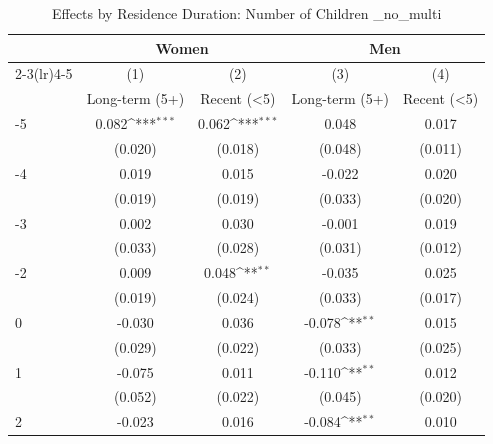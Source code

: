 \begin{table}[htbp]\centering
\def\sym#1{\ifmmode^{#1}\else\(^{#1}\)\fi}
\caption{Effects by Residence Duration: Number of Children \_no\_multi}
\begin{tabular}{l*{4}{c}}
\hline\hline
            &\multicolumn{2}{c}{Women}                  &\multicolumn{2}{c}{Men}                    \\\cmidrule(lr){2-3}\cmidrule(lr){4-5}
            &\multicolumn{1}{c}{(1)}&\multicolumn{1}{c}{(2)}&\multicolumn{1}{c}{(3)}&\multicolumn{1}{c}{(4)}\\
            &\multicolumn{1}{c}{Long-term (5+)}&\multicolumn{1}{c}{Recent (<5)}&\multicolumn{1}{c}{Long-term (5+)}&\multicolumn{1}{c}{Recent (<5)}\\
\hline
-5          &       0.082\sym{***}&       0.062\sym{***}&       0.048         &       0.017         \\
            &     (0.020)         &     (0.018)         &     (0.048)         &     (0.011)         \\
[1em]
-4          &       0.019         &       0.015         &      -0.022         &       0.020         \\
            &     (0.019)         &     (0.019)         &     (0.033)         &     (0.020)         \\
[1em]
-3          &       0.002         &       0.030         &      -0.001         &       0.019         \\
            &     (0.033)         &     (0.028)         &     (0.031)         &     (0.012)         \\
[1em]
-2          &       0.009         &       0.048\sym{**} &      -0.035         &       0.025         \\
            &     (0.019)         &     (0.024)         &     (0.033)         &     (0.017)         \\
[1em]
0           &      -0.030         &       0.036         &      -0.078\sym{**} &       0.015         \\
            &     (0.029)         &     (0.022)         &     (0.033)         &     (0.025)         \\
[1em]
1           &      -0.075         &       0.011         &      -0.110\sym{**} &       0.012         \\
            &     (0.052)         &     (0.022)         &     (0.045)         &     (0.020)         \\
[1em]
2           &      -0.023         &       0.016         &      -0.084\sym{**} &       0.010         \\

\end{tabular}
\end{table}

